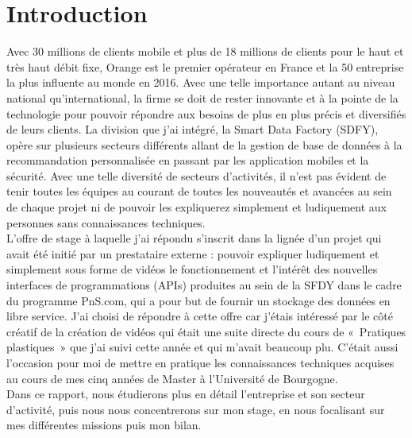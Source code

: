 \chapter*{Introduction}
\label{chap:introduction}

Avec 30 millions de clients mobile et plus de 18 millions de clients  pour le haut et très haut débit fixe, Orange est le premier opérateur en France et la 50 entreprise la plus influente au monde en 2016. Avec une telle importance autant au niveau national qu'international, la firme se doit de rester innovante et à la pointe de la technologie pour pouvoir répondre aux besoins de plus en plus précis et diversifiés de leurs clients. La division que j’ai intégré, la Smart Data Factory (SDFY), opère sur plusieurs secteurs différents allant de la gestion de base de données à la recommandation personnalisée en passant par les application mobiles et la sécurité. Avec une telle diversité de secteurs d’activités, il n’est pas évident de tenir toutes les équipes au courant de toutes les nouveautés et avancées au sein de chaque projet ni de pouvoir les expliquerez simplement et ludiquement aux personnes sans connaissances techniques.\\
L’offre de stage à laquelle j’ai répondu s’inscrit dans la lignée d’un projet qui avait été initié par un prestataire externe : pouvoir expliquer ludiquement et simplement sous forme de vidéos le fonctionnement et l’intérêt des nouvelles  interfaces de programmations (APIs) produites au sein de la SFDY dans le cadre du programme PnS.com, qui a pour but de fournir un stockage des données en libre service. J’ai choisi de répondre à cette offre car j’étais intéressé par le côté créatif de la création de vidéos qui était une suite directe du cours de « Pratiques plastiques » que j’ai suivi cette année et qui m’avait beaucoup plu. C’était aussi l’occasion pour moi de mettre en pratique les connaissances techniques acquises au cours de mes cinq années de Master à l’Université de Bourgogne.\\
Dans ce rapport, nous étudierons plus en détail l’entreprise et son secteur d’activité, puis nous nous concentrerons sur mon stage, en nous focalisant sur mes différentes missions puis mon bilan.
